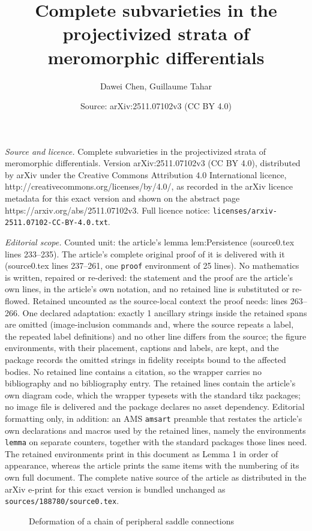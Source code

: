 \documentclass[10pt,a4paper]{amsart}
\title{Complete subvarieties in the projectivized strata of meromorphic differentials}
\author{Dawei Chen, Guillaume Tahar}
\date{Source: arXiv:2511.07102v3 (CC BY 4.0)}
\begin{document}
\maketitle

\noindent\emph{Source and licence.} Complete subvarieties in the projectivized strata of meromorphic differentials. Version arXiv:2511.07102v3 (CC BY 4.0), distributed by arXiv under the Creative Commons Attribution 4.0 International licence, http://creativecommons.org/licenses/by/4.0/, as recorded in the arXiv licence metadata for this exact version and shown on the abstract page https://arxiv.org/abs/2511.07102v3. Full licence notice: \texttt{licenses/arxiv-2511.07102-CC-BY-4.0.txt}.\par\smallskip

\noindent\textit{Editorial scope.} Counted unit: the article's lemma lem:Persistence (source0.tex lines 233--235). The article's complete original proof of it is delivered with it (source0.tex lines 237--261, one \texttt{proof} environment of 25 lines). No mathematics is written, repaired or re-derived: the statement and the proof are the article's own lines, in the article's own notation, and no retained line is substituted or re-flowed.  Retained uncounted as the source-local context the proof needs: lines 263--266.  One declared adaptation: exactly 1 ancillary strings inside the retained spans are omitted (image-inclusion commands and, where the source repeats a label, the repeated label definitions) and no other line differs from the source; the figure environments, with their placement, captions and labels, are kept, and the package records the omitted strings in fidelity receipts bound to the affected bodies.  No retained line contains a citation, so the wrapper carries no bibliography and no bibliography entry.  The retained lines contain the article's own diagram code, which the wrapper typesets with the standard tikz packages; no image file is delivered and the package declares no asset dependency.  Editorial formatting only, in addition: an AMS \texttt{amsart} preamble that restates the article's own declarations and macros used by the retained lines, namely the environments \texttt{lemma} on separate counters, together with the standard packages those lines need.  The retained environments print in this document as Lemma 1 in order of appearance, whereas the article prints the same items with the numbering of its own full document.  The complete native source of the article as distributed in the arXiv e-print for this exact version is bundled unchanged as \texttt{sources/188780/source0.tex}.
\begin{figure}

\caption{Deformation of a chain of peripheral saddle connections}\label{Figure:Deformation}
\end{figure}
\end{document}
